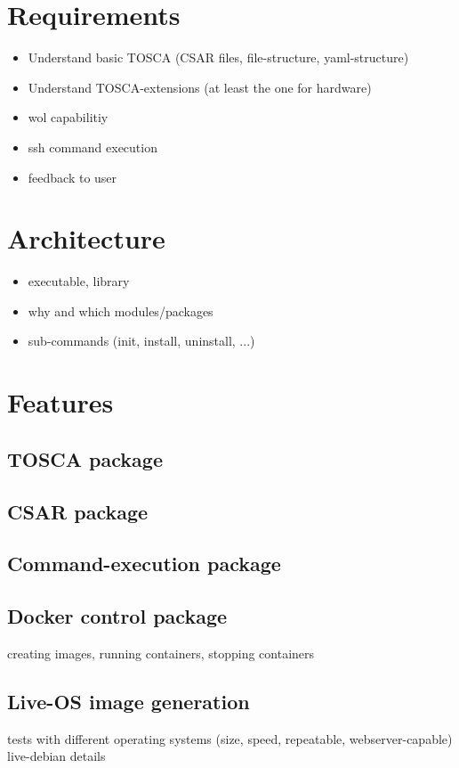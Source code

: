 \section{Requirements}
\begin{itemize}
  \item Understand basic TOSCA (CSAR files, file-structure, yaml-structure)
  \item Understand TOSCA-extensions (at least the one for hardware)
  \item wol capabilitiy
  \item ssh command execution
  \item feedback to user
\end{itemize}

\section{Architecture}
\begin{itemize}
  \item executable, library
  \item why and which modules/packages
  \item sub-commands (init, install, uninstall, ...)
\end{itemize}

\section{Features}

\subsection{TOSCA package}

\subsection{CSAR package}

\subsection{Command-execution package}

\subsection{Docker control package}
creating images, running containers, stopping containers

\subsection{Live-OS image generation}
tests with different operating systems (size, speed, repeatable, webserver-capable)
\newline
live-debian details

